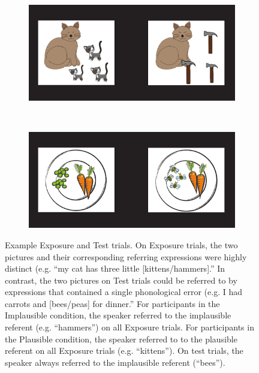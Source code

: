 \documentclass[man,floatsintext]{apa6}
\begin{document}
\begin{figure}[tb]
     \centering
        \begin{subfigure}[b]{.4 \textwidth}
            \caption{\label{fig:exposure}}
            \includegraphics[width=\textwidth]{figures/exposure.pdf}
        \end{subfigure}\\
        \vspace{12 pt}
        \begin{subfigure}[b]{.4 \textwidth}
           \caption{\label{fig:test}}
           \includegraphics[width=\textwidth]{figures/testing.pdf}
        \end{subfigure}
    \caption{Example Exposure and Test trials. On Exposure trials, the two pictures and their corresponding referring expressions were highly distinct (e.g. ``my cat has three little [kittens/hammers].'' In contrast, the two pictures on Test trials could be referred to by expressions that contained a single phonological error (e.g. I had carrots and [bees/peas] for dinner.'' For participants in the Implausible condition, the speaker referred to the implausible referent (e.g. ``hammers'') on all Exposure trials. For participants in the Plausible condition, the speaker referred to to the plausible referent on all Exposure trials (e.g. ``kittens''). On test trials, the speaker always referred to the implausible referent (``bees'').}
   \label{fig:stimuli}
\end{figure}
\end{document}
